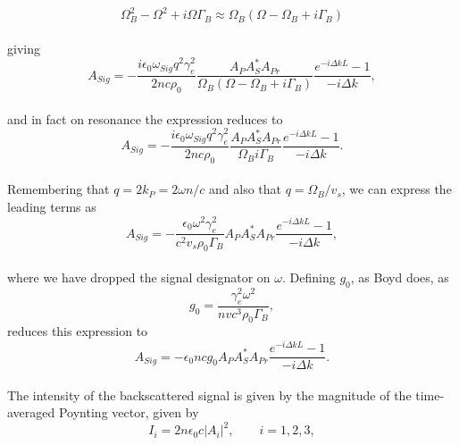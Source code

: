 \documentclass[%
  reprint,
  superscriptaddress,
  amsmath,amssymb,
  aps,
  prapplied,
]{revtex4-2}
\begin{document}
\\
\begin{equation}
\Omega_{B}^{2} - \Omega^{2} + i\Omega\Gamma_{B} \approx \Omega_{B}(\Omega - \Omega_{B} + i\Gamma_{B})
\end{equation}
\\
giving
\\
\begin{equation}
  A_{Sig} = -\frac{i\epsilon_{0}\omega_{Sig}q^{2}\gamma_{e}^{2}}{2nc\rho_{0}}\frac{A_{P}A_{S}^{*}A_{Pr}}{\Omega_{B}(\Omega - \Omega_{B} + i\Gamma_{B})} \frac{e^{-i\Delta kL} - 1}{-i\Delta k},
  \label{eq:resonance}
\end{equation}
\\
and in fact on resonance the expression reduces to
\\
\begin{equation}
  A_{Sig} = -\frac{i\epsilon_{0}\omega_{Sig}q^{2}\gamma_{e}^{2}}{2nc\rho_{0}}\frac{A_{P}A_{S}^{*}A_{Pr}}{\Omega_{B}i\Gamma_{B}} \frac{e^{-i\Delta kL} - 1}{-i\Delta k}.
\end{equation}
\\
Remembering that $q = 2k_{P} = 2\omega n/c$ and also that $q = \Omega_{B}/v_{s}$, we can express the leading terms as
\\
\begin{equation}
  A_{Sig} = -\frac{\epsilon_{0}\omega^{2}\gamma_{e}^{2}}{c^{2}v_{s}\rho_{0}\Gamma_{B}}A_{P}A_{S}^{*}A_{Pr} \frac{e^{-i\Delta kL} - 1}{-i\Delta k},
\end{equation}
\\
where we have dropped the signal designator on $\omega$. Defining $g_{0}$, as Boyd does, as
\\
\begin{equation}
  g_{0} = \frac{\gamma_{e}^{2}\omega^{2}}{nvc^{3}\rho_{0}\Gamma_{B}},
\end{equation}
reduces this expression to
\\
\begin{equation}
  A_{Sig} = -\epsilon_{0}ncg_{0}A_{P}A_{S}^{*}A_{Pr} \frac{e^{-i\Delta kL} - 1}{-i\Delta k}.
\end{equation}
\\
The intensity of the backscattered signal is given by the magnitude of the time-averaged Poynting vector, given by
\\
\begin{equation}
  I_{i} = 2n\epsilon_{0}c|A_{i}|^{2}, \qquad i = 1,2,3,
\end{equation}
\\
\end{document}
